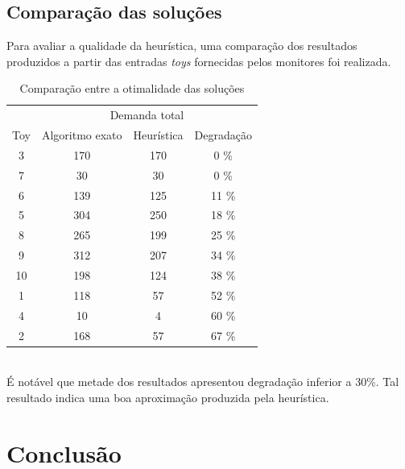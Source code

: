 \documentclass{article}
\begin{document}
\pagebreak


\subsection{Comparação das soluções}
Para avaliar a qualidade da heurística, uma comparação dos resultados produzidos a partir das entradas \textit{toys} fornecidas pelos monitores foi realizada.
\begin{table}[h]
  \centering
  \begin{tabular}{ c c c c }
    \hline
    \multicolumn{1}{c}{} & \multicolumn{3}{c}{Demanda total} \\
    \cline{2-4}
    \multicolumn{1}{c}{Toy} & Algoritmo exato & Heurística & \multicolumn{1}{c}{Degradação} \\ \hline
    3  & 170 & 170 & \phantom{0}0  \% \\
    7  & 30  & 30  & \phantom{0}0  \% \\
    6  & 139 & 125 & 11 \% \\
    5  & 304 & 250 & 18 \% \\
    8  & 265 & 199 & 25 \% \\
    9  & 312 & 207 & 34 \% \\
    10 & 198 & 124 & 38 \% \\
    1  & 118 & 57  & 52 \% \\
    4  & 10  & 4   & 60 \% \\
    2  & 168 & 57  & 67 \% \\
    \hline
  \end{tabular}
  \caption{Comparação entre a otimalidade das soluções}
\end{table} \\
É notável que metade dos resultados apresentou degradação inferior a 30\%. Tal resultado indica uma boa aproximação produzida pela heurística.

\section{Conclusão}


\pagebreak



\end{document}
